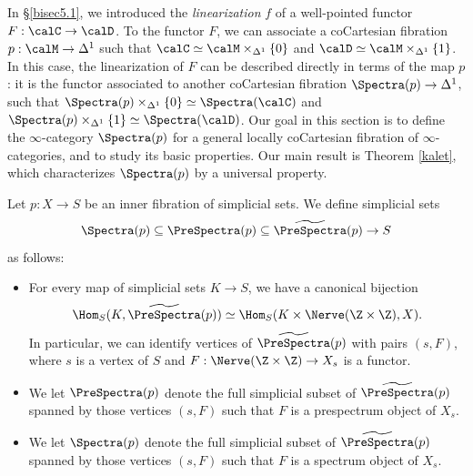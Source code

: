 In \S \ref{bisec5.1}, we introduced the {\it linearization} $f$ of a well-pointed functor
$F: \calC \rightarrow \calD$. To the functor $F$, we can associate a coCartesian
fibration $p: \calM \rightarrow \Delta^1$ such that $\calC \simeq \calM \times_{ \Delta^1} \{0\}$
and $\calD \simeq \calM \times_{ \Delta^1 } \{1\}$. In this case, the linearization of
$F$ can be described directly in terms of the map $p$: it is the functor associated to
another coCartesian fibration $\Spectra(p) \rightarrow \Delta^1$, such that
$\Spectra(p) \times_{ \Delta^1} \{0\} \simeq \Spectra(\calC)$ and
$\Spectra(p) \times_{ \Delta^1} \{1\} \simeq \Spectra(\calD)$. Our goal in this section
is to define the $\infty$-category $\Spectra(p)$ for a general locally coCartesian fibration
of $\infty$-categories, and to study its basic properties. Our main result is 
Theorem \ref{kalet}, which characterizes $\Spectra(p)$ by a universal property.

\begin{definition}\label{linfib}
Let $p: X \rightarrow S$ be an inner fibration of simplicial sets. 
We define simplicial sets
$$\Spectra(p) \subseteq \PreSpectra(p) \subseteq \widetilde{ \PreSpectra}(p)
\rightarrow S$$
as follows:
\begin{itemize}
\item For every map of simplicial sets $K \rightarrow S$, we have a canonical
bijection $$\Hom_{S}(K, \widetilde{\PreSpectra}(p))
\simeq \Hom_{S}( K \times \Nerve( \Z \times \Z), X).$$
In particular, we can identify vertices of $\widetilde{\PreSpectra}(p)$ with pairs
$(s,F)$, where $s$ is a vertex of $S$ and $F: \Nerve( \Z \times \Z) \rightarrow X_{s}$
is a functor.
\item We let $\PreSpectra(p)$ denote the full simplicial subset of
$\widetilde{ \PreSpectra}(p)$ spanned by those vertices $(s,F)$ such that
$F$ is a prespectrum object of $X_{s}$.
\item We let $\Spectra(p)$ denote the full simplicial subset of $\widetilde{\PreSpectra}(p)$
spanned by those vertices $(s,F)$ such that $F$ is a spectrum object of $X_{s}$.
\end{itemize}
\end{definition}

